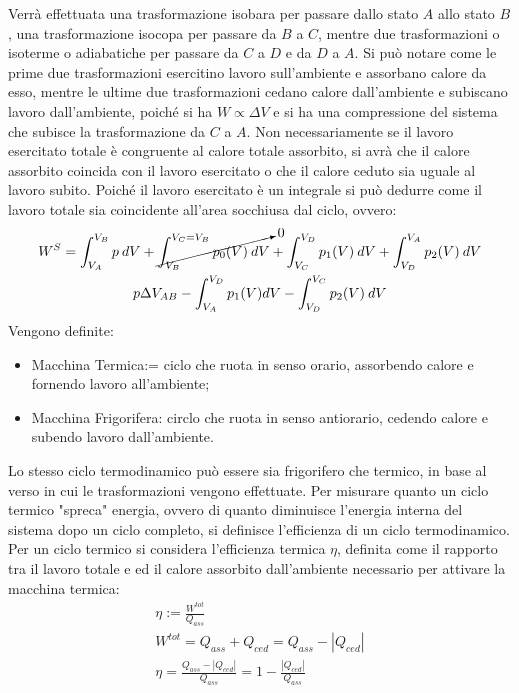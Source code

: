 \documentclass{article}
\numberwithin{equation}{subsection}
\begin{document}
Verrà effettuata una trasformazione isobara per 
passare dallo stato $A$ allo stato $B$, una trasformazione 
isocopa per passare da $B$ a $C$, mentre due trasformazioni 
o isoterme o adiabatiche per passare da $C$ a $D$ e da $D$ a $A$. 
Si può notare come le prime due trasformazioni esercitino 
lavoro sull'ambiente e assorbano calore da esso, mentre 
le ultime due trasformazioni cedano calore dall'ambiente e 
subiscano lavoro dall'ambiente, poiché si ha $W\propto \Delta V$ 
e si ha una compressione del sistema che subisce la trasformazione 
da $C$ a $A$. Non necessariamente se il lavoro esercitato totale è 
congruente al calore totale assorbito, si avrà che il calore 
assorbito coincida con il lavoro esercitato o che il calore 
ceduto sia uguale al lavoro subito. Poiché il lavoro esercitato 
è un integrale si può dedurre come il lavoro totale sia 
coincidente all'area socchiusa dal ciclo, ovvero:
\begin{gather}
    W^S=\displaystyle\int_{V_A}^{V_B}p\:dV+\cancelto{0}{\int_{V_B}^{V_C=V_B}p_0(V)\:dV}+\int_{V_C}^{V_D}p_1(V)\:dV+\int_{V_D}^{V_A}p_2(V)\:dV\\
    p\Delta V_{AB}-\int_{V_A}^{V_D}p_1(V)dV-\int_{V_D}^{V_C}p_2(V)\:dV
\end{gather}
Vengono definite:
\begin{itemize}
    \item Macchina Termica:= ciclo che ruota in senso orario, 
    assorbendo calore e fornendo lavoro all'ambiente;\\
    \item Macchina Frigorifera: circlo che ruota in senso 
    antiorario, cedendo calore e subendo lavoro dall'ambiente.
\end{itemize}
Lo stesso ciclo termodinamico può essere sia frigorifero che 
termico, in base al verso in cui le trasformazioni vengono 
effettuate. Per misurare quanto un ciclo termico "spreca" 
energia, ovvero di quanto diminuisce l'energia interna del 
sistema dopo un ciclo completo, si definisce l'efficienza di 
un ciclo termodinamico. 
Per un ciclo termico si considera l'efficienza termica $\eta$, 
definita come il rapporto tra il lavoro totale e ed il 
calore assorbito dall'ambiente necessario per attivare la 
macchina termica:
\begin{gather}
    \eta:=\displaystyle\frac{W^{tot}}{Q_{ass}}\\
    W^{tot}=Q_{ass}+Q_{ced}=Q_{ass}-\left|Q_{ced}\right|\\
    \eta=\displaystyle\frac{Q_{ass}-\left|Q_{ced}\right|}{Q_{ass}}=1-\frac{\left|Q_{ced}\right|}{Q_{ass}}
\end{gather}
\end{document}
